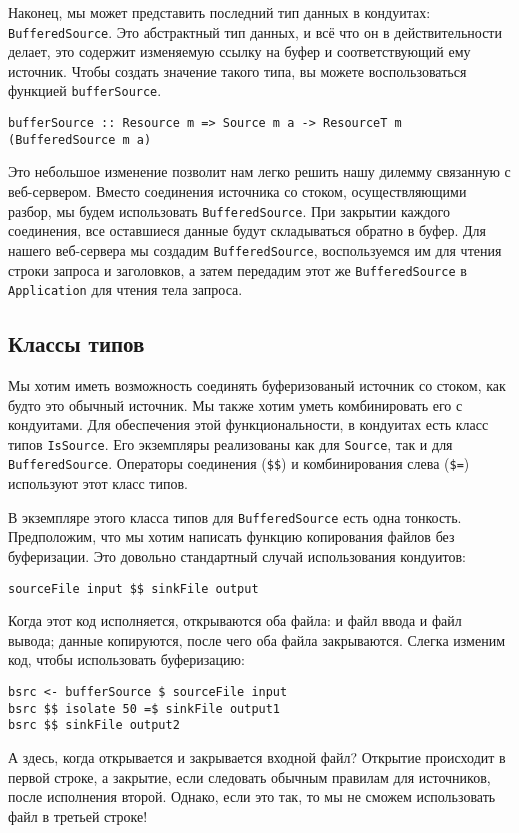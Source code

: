 {Наконец, мы может представить последний тип данных в кондуитах: 
\lstinline'BufferedSource'. Это абстрактный тип данных, и всё что он в 
действительности делает, это содержит изменяемую ссылку на буфер и 
соответствующий ему источник. Чтобы создать значение такого типа, вы можете 
воспользоваться функцией \lstinline'bufferSource'.
\begin{verbatim}
bufferSource :: Resource m => Source m a -> ResourceT m (BufferedSource m a)
\end{verbatim}
Это небольшое изменение позволит нам легко решить нашу дилемму связанную с 
веб-сервером. Вместо соединения источника со стоком, осуществляющими разбор, 
мы будем использовать \lstinline'BufferedSource'. При закрытии каждого 
соединения, все оставшиеся данные будут складываться обратно в буфер. 
Для нашего веб-сервера мы создадим \lstinline'BufferedSource', воспользуемся 
им для чтения строки запроса и заголовков, а затем передадим этот же
\lstinline'BufferedSource' в \lstinline{Application} для чтения тела запроса.

\subsection{Классы типов}
Мы хотим иметь возможность соединять буферизованый источник со стоком,
как будто это обычный источник.
Мы также хотим уметь комбинировать его с кондуитами. Для обеспечения этой функциональности,
в кондуитах есть класс типов \lstinline'IsSource'. Его экземпляры реализованы как для
\lstinline'Source', так и для \lstinline'BufferedSource'. 
Операторы соединения (\verb#$$#) и комбинирования слева (\verb#$=#) используют этот класс типов.

В экземпляре этого класса типов для \lstinline'BufferedSource' есть одна тонкость.
Предположим, что мы хотим написать функцию копирования файлов без
буферизации. Это довольно стандартный случай использования кондуитов:
\begin{lstlisting}
sourceFile input $$ sinkFile output
\end{lstlisting}
Когда этот код исполняется, открываются оба файла: и файл ввода и файл вывода; данные 
копируются, после чего оба файла закрываются. Слегка изменим код, чтобы 
использовать буферизацию:
\begin{lstlisting}
bsrc <- bufferSource $ sourceFile input
bsrc $$ isolate 50 =$ sinkFile output1
bsrc $$ sinkFile output2
\end{lstlisting}
А здесь, когда открывается и закрывается входной файл? Открытие
происходит в первой строке, а закрытие, если следовать обычным 
правилам для источников, после исполнения второй.
Однако, если это так, то мы не сможем использовать файл в третьей строке!

}

